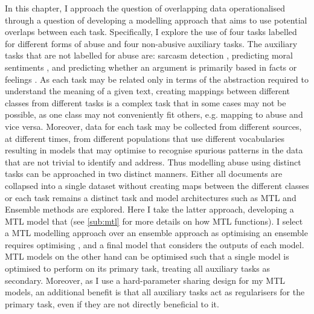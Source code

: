In this chapter, I approach the question of overlapping data operationalised through a question of developing a modelling approach that aims to use potential overlaps between each task.
Specifically, I explore the use of four tasks labelled for different forms of abuse and four non-abusive auxiliary tasks.
The auxiliary tasks that are not labelled for abuse are: sarcasm detection \citep{Oraby_sarcasm:2016}, predicting moral sentiments \citep{Hoover:2019}, and predicting whether an argument is primarily based in facts or feelings \citep{Oraby_factfeel:2015}.
As each task may be related only in terms of the abstraction required to understand the meaning of a given text, creating mappings between different classes from different tasks is a complex task that in some cases may not be possible, as one class may not conveniently fit others, e.g. mapping  to abuse and vice versa.
Moreover, data for each task may be collected from different sources, at different times, from different populations that use different vocabularies resulting in models that may optimise to recognise spurious patterns in the data that are not trivial to identify and address.
Thus modelling abuse using distinct tasks can be approached in two distinct manners. Either all documents are collapsed into a single dataset without creating maps between the different classes or each task remains a distinct task and model architectures such as MTL and Ensemble methods are explored.
Here I take the latter approach, developing a MTL model that  (see \cref{sub:mtl} for more details on how MTL functions).
I select a MTL modelling approach over an ensemble approach as optimising an ensemble requires optimising , and a final model that considers the outputs of each model. 
MTL models on the other hand can be optimised such that a single model is optimised to perform on its primary task, treating all auxiliary tasks as secondary.
Moreover, as I use a hard-parameter sharing design for my MTL models, an additional benefit is that all auxiliary tasks act as regularisers for the primary task, even if they are not directly beneficial to it.

